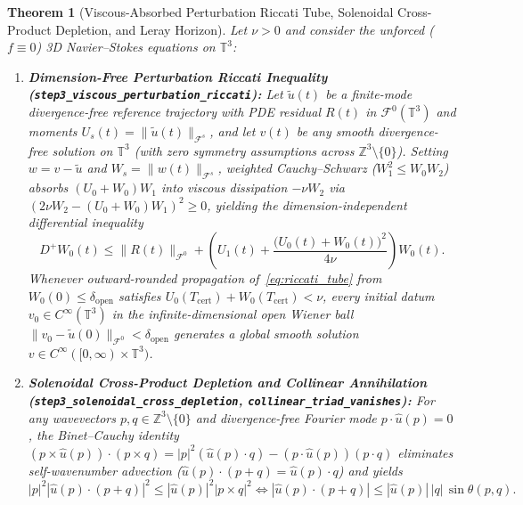 \documentclass[11pt]{article}
\theoremstyle{plain}
\newtheorem{theorem}{Theorem}[section]
\theoremstyle{definition}
\begin{document}
\begin{theorem}[Viscous-Absorbed Perturbation Riccati Tube, Solenoidal Cross-Product Depletion, and Leray Horizon]\label{thm:step3}
Let $\nu > 0$ and consider the unforced ($f \equiv 0$) 3D Navier--Stokes equations on $\mathbb{T}^3$:
\begin{enumerate}
  \item \textbf{Dimension-Free Perturbation Riccati Inequality (\texttt{step3\_viscous\_\allowbreak perturbation\_riccati}):} Let $\tilde{u}(t)$ be a finite-mode divergence-free reference trajectory with PDE residual $R(t)$ in $\mathcal{F}^0(\mathbb{T}^3)$ and moments $U_s(t) = \|\tilde{u}(t)\|_{\mathcal{F}^s}$, and let $v(t)$ be \emph{any} smooth divergence-free solution on $\mathbb{T}^3$ (with zero symmetry assumptions across $\mathbb{Z}^3 \setminus \{0\}$). Setting $w = v - \tilde{u}$ and $W_s = \|w(t)\|_{\mathcal{F}^s}$, weighted Cauchy--Schwarz ($W_1^2 \le W_0 W_2$) absorbs $(U_0 + W_0)W_1$ into viscous dissipation $-\nu W_2$ via $(2\nu W_2 - (U_0 + W_0)W_1)^2 \ge 0$, yielding the dimension-independent differential inequality
  \begin{equation}\label{eq:riccati_tube}
    D^+ W_0(t) \le \|R(t)\|_{\mathcal{F}^0} + \left(U_1(t) + \frac{\big(U_0(t) + W_0(t)\big)^2}{4\nu}\right) W_0(t).
  \end{equation}
  Whenever outward-rounded propagation of~\eqref{eq:riccati_tube} from $W_0(0) \le \delta_{\mathrm{open}}$ satisfies $U_0(T_{\mathrm{cert}}) + W_0(T_{\mathrm{cert}}) < \nu$, every initial datum $v_0 \in C^\infty(\mathbb{T}^3)$ in the infinite-dimensional open Wiener ball $\|v_0 - \tilde{u}(0)\|_{\mathcal{F}^0} < \delta_{\mathrm{open}}$ generates a global smooth solution $v \in C^\infty([0,\infty)\times\mathbb{T}^3)$.
  \item \textbf{Solenoidal Cross-Product Depletion and Collinear Annihilation (\texttt{step3\_solenoidal\_\allowbreak cross\_depletion}, \texttt{collinear\_triad\_vanishes}):} For any wavevectors $p, q \in \mathbb{Z}^3 \setminus \{0\}$ and divergence-free Fourier mode $p \cdot \hat{u}(p) = 0$, the Binet--Cauchy identity $(p \times \hat{u}(p))\cdot(p \times q) = |p|^2(\hat{u}(p)\cdot q) - (p\cdot\hat{u}(p))(p\cdot q)$ eliminates self-wavenumber advection ($\hat{u}(p)\cdot(p+q) = \hat{u}(p)\cdot q$) and yields
  \begin{equation}\label{eq:sin_theta}
    |p|^2 |\hat{u}(p) \cdot (p + q)|^2 \le |\hat{u}(p)|^2 |p \times q|^2 \iff |\hat{u}(p) \cdot (p + q)| \le |\hat{u}(p)|\,|q|\,\sin\theta(p,q).
  \end{equation}

\end{enumerate}
\end{theorem}
\end{document}
